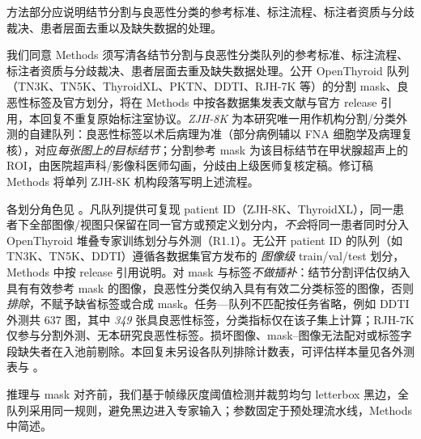 \begin{reviewercomment}
方法部分应说明结节分割与良恶性分类的参考标准、标注流程、标注者资质与分歧裁决、患者层面去重以及缺失数据的处理。
\end{reviewercomment}
\begin{authorresponse}
我们同意 Methods 须写清各结节分割与良恶性分类队列的参考标准、标注流程、标注者资质与分歧裁决、患者层面去重及缺失数据处理。公开 OpenThyroid 队列（TN3K、TN5K、ThyroidXL、PKTN、DDTI、RJH-7K 等）的分割 mask、良恶性标签及官方划分，将在 Methods 中按各数据集发表文献与官方 release 引用，本回复不重复原始标注室协议。\emph{ZJH-8K} 为本研究唯一用作机构分割/分类外测的自建队列：良恶性标签以术后病理为准（部分病例辅以 FNA 细胞学及病理复核），对应\emph{每张图上的目标结节}；分割参考 mask 为该目标结节在甲状腺超声上的 ROI，由医院超声科/影像科医师勾画，分歧由上级医师复核定稿。修订稿 Methods 将单列 ZJH-8K 机构段落写明上述流程。\par
各划分角色见 。凡队列提供可复现 patient ID（ZJH-8K、ThyroidXL），同一患者下全部图像/视图只保留在同一官方或预定义划分内，\emph{不会}将同一患者同时分入 OpenThyroid 堆叠专家训练划分与外测（R1.1）。无公开 patient ID 的队列（如 TN3K、TN5K、DDTI）遵循各数据集官方发布的 \emph{图像级} train/val/test 划分，Methods 中按 release 引用说明。对 mask 与标签\emph{不做插补}：结节分割评估仅纳入具有有效参考 mask 的图像，良恶性分类仅纳入具有有效二分类标签的图像，否则\emph{排除}，不赋予缺省标签或合成 mask。任务—队列不匹配按任务省略，例如 DDTI 外测共 637 图，其中 \emph{349} 张具良恶性标签，分类指标仅在该子集上计算；RJH-7K 仅参与分割外测、无本研究良恶性标签。损坏图像、mask--图像无法配对或标签字段缺失者在入池前剔除。本回复未另设各队列排除计数表，可评估样本量见各外测表与 。\par
推理与 mask 对齐前，我们基于帧缘灰度阈值检测并裁剪均匀 letterbox 黑边，全队列采用同一规则，避免黑边进入专家输入；参数固定于预处理流水线，Methods 中简述。\par
\par
\end{authorresponse}

